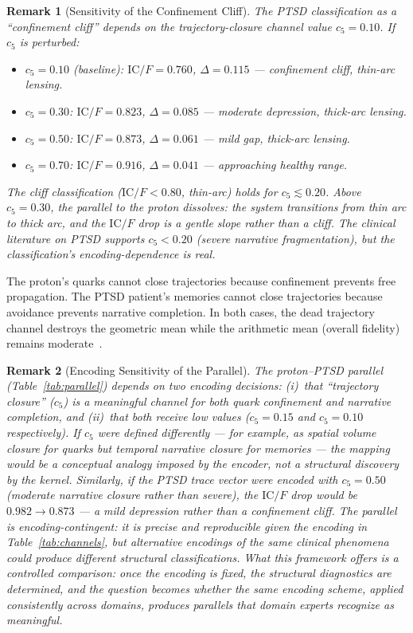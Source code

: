 \documentclass[
  aps,
  prd,
  twocolumn,
  superscriptaddress,
  nofootinbib,
  floatfix
]{revtex4-2}
\newtheorem{remark}{Remark}
\newcommand{\IC}{\mathrm{IC}}
\begin{document}
\begin{remark}[Sensitivity of the Confinement Cliff]
\label{rem:sensitivity}
The PTSD classification as a ``confinement cliff'' depends on
the trajectory-closure channel value $c_5 = 0.10$.  If $c_5$
is perturbed:
\begin{itemize}
\item $c_5 = 0.10$ (baseline): $\IC/F = 0.760$, $\Delta = 0.115$
  --- confinement cliff, thin-arc lensing.
\item $c_5 = 0.30$: $\IC/F = 0.823$, $\Delta = 0.085$
  --- moderate depression, thick-arc lensing.
\item $c_5 = 0.50$: $\IC/F = 0.873$, $\Delta = 0.061$
  --- mild gap, thick-arc lensing.
\item $c_5 = 0.70$: $\IC/F = 0.916$, $\Delta = 0.041$
  --- approaching healthy range.
\end{itemize}
The cliff classification ($\IC/F < 0.80$, thin-arc) holds for
$c_5 \lesssim 0.20$.  Above $c_5 = 0.30$, the parallel to
the proton dissolves: the system transitions from thin arc
to thick arc, and the $\IC/F$ drop is a gentle slope
rather than a cliff.  The clinical literature on PTSD
supports $c_5 < 0.20$ (severe narrative fragmentation),
but the classification's encoding-dependence is real.
\end{remark}

The proton's quarks cannot close trajectories because
confinement prevents free propagation.  The PTSD patient's
memories cannot close trajectories because avoidance prevents
narrative completion.  In both cases, the dead trajectory
channel destroys the geometric mean while the arithmetic
mean (overall fidelity) remains
moderate~\cite{ehlers2000cognitive,vanderkolk2014body}.

\begin{remark}[Encoding Sensitivity of the Parallel]
\label{rem:parallel}
The proton--PTSD parallel (Table~\ref{tab:parallel})
depends on two encoding decisions: (i)~that ``trajectory
closure'' ($c_5$) is a meaningful channel for both quark
confinement and narrative completion, and (ii)~that both
receive low values ($c_5 = 0.15$ and $c_5 = 0.10$
respectively).  If $c_5$ were defined differently --- for
example, as spatial volume closure for quarks but temporal
narrative closure for memories --- the mapping would be a
\emph{conceptual analogy imposed by the encoder}, not a
structural discovery by the kernel.  Similarly, if the PTSD
trace vector were encoded with $c_5 = 0.50$ (moderate
narrative closure rather than severe), the $\IC/F$ drop
would be $0.982 \to 0.873$ --- a mild depression rather
than a confinement cliff.  The parallel is
\emph{encoding-contingent}: it is precise and reproducible
given the encoding in Table~\ref{tab:channels}, but
alternative encodings of the same clinical phenomena could
produce different structural classifications.  What this
framework offers is a \emph{controlled comparison}: once
the encoding is fixed, the structural diagnostics are
determined, and the question becomes whether the same
encoding scheme, applied consistently across domains,
produces parallels that domain experts recognize as
meaningful.
\end{remark}
\end{document}
